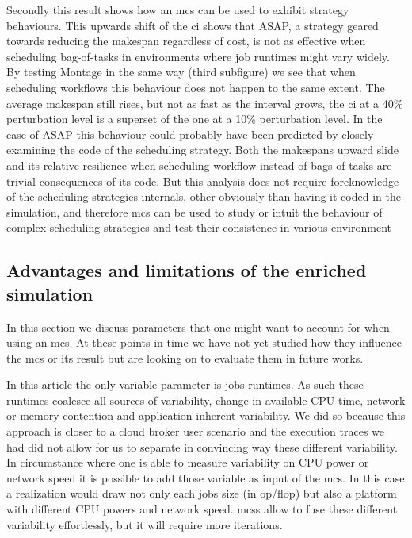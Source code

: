 \documentclass[10pt,conference,compsocconf]{IEEEtran}
\begin{document}
Secondly this result shows how an \ac{mcs} can be used to exhibit strategy
behaviours. This upwards shift of the \ac{ci} shows that ASAP, a strategy
geared towards reducing the makespan regardless of cost, is not as effective
when scheduling bag-of-tasks in environments where job runtimes might vary
widely. By testing Montage in the same way (third subfigure) we see that when
scheduling workflows this behaviour does not happen to the same extent. The
average makespan still rises, but not as fast as the interval grows, the \ac{ci}
at a 40\% perturbation level is a superset of the one at a 10\% perturbation
level. In the case of ASAP this behaviour could probably have been predicted by
closely examining the code of the scheduling strategy. Both the makespans upward
slide and its relative resilience when scheduling workflow instead of
bags-of-tasks are trivial consequences of its code. But this analysis does not
require foreknowledge of the scheduling strategies internals, other obviously
than having it coded in the simulation, and therefore \ac{mcs} can be used to
study or intuit the behaviour of complex scheduling strategies and test their
consistence in various environment 


\subsection{Advantages and limitations of the enriched simulation}\label{sec:lim}

In this section we discuss parameters that one might want to account for when
using an \ac{mcs}. At these points in time we have not yet studied how they
influence the \ac{mcs} or its result but are looking on to evaluate them in
future works.

In this article the only variable parameter is jobs runtimes. As such these
runtimes coalesce all sources of variability, change in available CPU time,
network or memory contention and application inherent variability. We did so
because this approach is closer to a cloud broker user scenario and  the
execution traces we had did not allow for us to separate in convincing way these
different variability. In circumstance where one is able to measure variability
on CPU power or network speed it is possible to add those variable as input of
the \ac{mcs}. In this case a realization would draw not only each jobs size (in
op/flop) but also a platform with different CPU powers and network speed.
\acp{mcs} allow to fuse these different variability effortlessly, but it will
require more iterations. 
\end{document}
